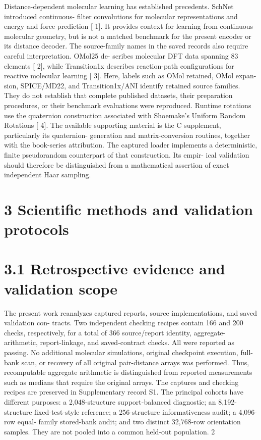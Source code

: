 \documentclass[11pt]{article}
\begin{document}
Distance-dependent molecular learning has established precedents. SchNet introduced continuous-
filter convolutions for molecular representations and energy and force prediction [ 1]. It provides
context for learning from continuous molecular geometry, but is not a matched benchmark for the
present encoder or its distance decoder.
The source-family names in the saved records also require careful interpretation. OMol25 de-
scribes molecular DFT data spanning 83 elements [ 2], while Transition1x describes reaction-path
configurations for reactive molecular learning [ 3]. Here, labels such as OMol retained, OMol expan-
sion, SPICE/MD22, and Transition1x/ANI identify retained source families. They do not establish
that complete published datasets, their preparation procedures, or their benchmark evaluations
were reproduced.
Runtime rotations use the quaternion construction associated with Shoemake’s Uniform Random
Rotations [ 4]. The available supporting material is the C supplement, particularly its quaternion-
generation and matrix-conversion routines, together with the book-series attribution. The captured
loader implements a deterministic, finite pseudorandom counterpart of that construction. Its empir-
ical validation should therefore be distinguished from a mathematical assertion of exact independent
Haar sampling.

\section*{3 Scientific methods and validation protocols}


\section*{3.1 Retrospective evidence and validation scope}

The present work reanalyzes captured reports, source implementations, and saved validation con-
tracts. Two independent checking recipes contain 166 and 200 checks, respectively, for a total of 366
source/report identity, aggregate-arithmetic, report-linkage, and saved-contract checks. All were
reported as passing. No additional molecular simulations, original checkpoint execution, full-bank
scan, or recovery of all original pair-distance arrays was performed. Thus, recomputable aggregate
arithmetic is distinguished from reported measurements such as medians that require the original
arrays. The captures and checking recipes are preserved in Supplementary record S1.
The principal cohorts have different purposes: a 2,048-structure support-balanced diagnostic; an
8,192-structure fixed-test-style reference; a 256-structure informativeness audit; a 4,096-row equal-
family stored-bank audit; and two distinct 32,768-row orientation samples. They are not pooled
into a common held-out population.
2
\end{document}
